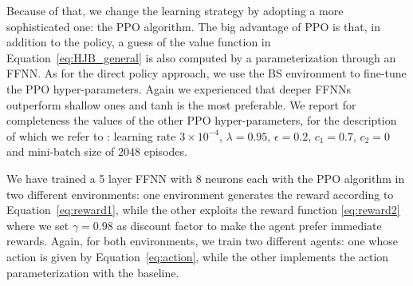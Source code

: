 \documentclass[runningheads]{m2ef}
\begin{document}
Because of that, we change the learning strategy by adopting a more sophisticated one: the PPO algorithm. The big advantage of PPO is that, in addition to the policy, a guess of the value function in Equation~\eqref{eq:HJB_general} is also computed by a parameterization through an FFNN. As for the direct policy approach, we use the BS environment to fine-tune the PPO hyper-parameters. Again we experienced that deeper FFNNs outperform shallow ones and tanh is the most preferable. We report for completeness the values of the other PPO hyper-parameters, for the description of which we refer to \cite{Schulman2017}: learning rate $3\times 10^{-4}$, $\lambda=0.95$, $\epsilon=0.2$, $c_1=0.7$, $c_2=0$ and mini-batch size of 2048 episodes. 

We have trained a 5 layer FFNN with 8 neurons each with the PPO algorithm in two different environments: one environment generates the reward according to Equation~\eqref{eq:reward1}, while the other exploits the reward function \eqref{eq:reward2} where we set $\gamma=0.98$ as discount factor to make the agent prefer immediate rewards. Again, for both environments, we train two different agents: one whose action is given by Equation~\eqref{eq:action}, while the other implements the action parameterization with the baseline.
\end{document}
